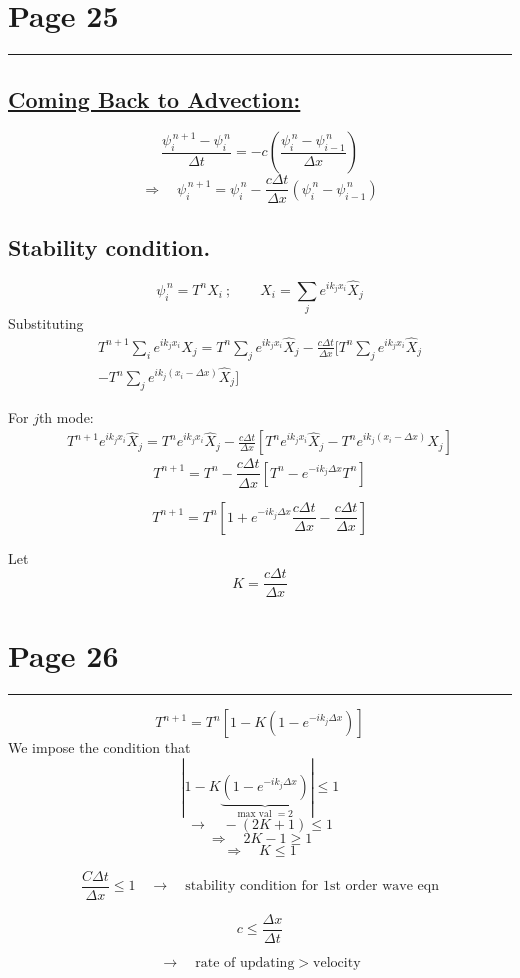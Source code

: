 \documentclass[11pt,a4paper]{article}
\newcommand{\pagehead}[1]{%
  \clearpage
  \section*{Page #1}
  \vspace{-0.6em}
  {\color{black!45}\rule{\linewidth}{0.5pt}}
  \vspace{0.4em}
}
\begin{document}
\pagehead{25}

\subsection*{\underline{Coming Back to Advection:}}

\[
\frac{\psi_i^{\,n+1}-\psi_i^{\,n}}{\Delta t}
=-c\left(\frac{\psi_i^{\,n}-\psi_{i-1}^{\,n}}{\Delta x}\right)
\]
\[
\Rightarrow\quad \psi_i^{\,n+1}
=\psi_i^{\,n}-\frac{c\Delta t}{\Delta x}
\left(\psi_i^{\,n}-\psi_{i-1}^{\,n}\right)
\]

\subsection*{Stability condition.}

\[
\psi_i^{\,n}=T^nX_i\ ;\qquad
X_i=\sum_j e^{ik_jx_i}\hat X_j
\]
Substituting
\begin{multline*}
T^{n+1}\sum_i e^{ik_jx_i}\hat X_j
=T^n\sum_j e^{ik_jx_i}\hat X_j
-\frac{c\Delta t}{\Delta x}\Biggl[T^n\sum_j e^{ik_jx_i}\hat X_j\\
-T^n\sum_j e^{ik_j(x_i-\Delta x)}\hat X_j\Biggr]
\end{multline*}

For $j$th mode:
\begin{multline*}
T^{n+1}e^{ik_jx_i}\hat X_j
=T^ne^{ik_jx_i}\hat X_j
-\frac{c\Delta t}{\Delta x}
\left[T^ne^{ik_jx_i}\hat X_j
-T^ne^{ik_j(x_i-\Delta x)}\hat X_j\right]
\end{multline*}
\[
T^{n+1}=T^n-\frac{c\Delta t}{\Delta x}
\left[T^n-e^{-ik_j\Delta x}T^n\right]
\]
\begin{handbox}
\[
T^{n+1}=T^n\left[1+e^{-ik_j\Delta x}\frac{c\Delta t}{\Delta x}
-\frac{c\Delta t}{\Delta x}\right]
\]
\end{handbox}
Let
\[
K=\frac{c\Delta t}{\Delta x}
\]

\pagehead{26}

\[
T^{n+1}=T^n\left[1-K\left(1-e^{-ik_j\Delta x}\right)\right]
\]
We impose the condition that
\[
\left|1-K\underbrace{\left(1-e^{-ik_j\Delta x}\right)}_{\text{max val }=2}\right|\le1
\]
\[
\longrightarrow\quad -(2K+1)\le1
\]
\[
\Rightarrow\quad 2K-1\ge1
\]
\[
\Rightarrow\quad \boxed{K\le1}
\]
\begin{handbox}
\[
\frac{C\Delta t}{\Delta x}\le1
\quad\to\quad\text{stability condition for 1st order wave eqn}
\]
\end{handbox}
\begin{handbox}
\[
c\le\frac{\Delta x}{\Delta t}
\]
\end{handbox}
\[
\longrightarrow\quad \text{rate of updating}>\text{velocity}
\]
\end{document}
